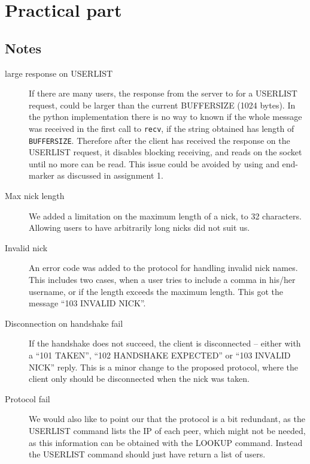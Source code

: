 \section{Practical part}

\subsection{Notes}
\begin{description}
    \item[large response on USERLIST]
        If there are many users, the response from the server to for a USERLIST request, could be larger than the current BUFFERSIZE (1024 bytes). In the python implementation there is no way to known if the whole message was received in the first call to \texttt{recv}, if the string obtained has length of \texttt{BUFFERSIZE}. Therefore after the client has received the response on the USERLIST request, it disables blocking receiving, and reads on the socket until no more can be read. This issue could be avoided by using and end-marker as discussed in assignment 1.
    \item[Max nick length]
        We added a limitation on the maximum length of a nick, to 32 characters. Allowing users to have arbitrarily long nicks did not suit us.
    \item[Invalid nick]
        An error code was added to the protocol for handling invalid nick names. This includes two cases, when a user tries to include a comma in his/her username, or if the length exceeds the maximum length. This got the message ``103 INVALID NICK''.
    \item[Disconnection on handshake fail]
        If the handshake does not succeed, the client is disconnected -- either with a ``101 TAKEN'', ``102 HANDSHAKE EXPECTED'' or ``103 INVALID NICK'' reply. This is a minor change to the proposed protocol, where the client only should be disconnected when the nick was taken.
    \item[Protocol fail]
        We would also like to point our that the protocol is a bit redundant, as the USERLIST command lists the IP of each peer, which might not be needed, as this information can be obtained with the LOOKUP command. Instead the USERLIST command should just have return a list of users.
\end{description}

